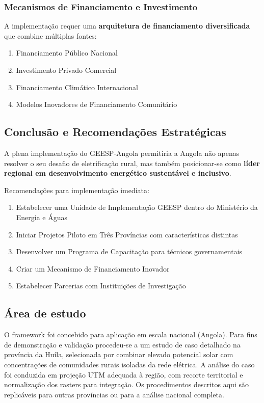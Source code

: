 \documentclass[12pt, a4paper]{article}
\begin{document}
\subsubsection{Mecanismos de Financiamento e Investimento}

A implementação requer uma \textbf{arquitetura de financiamento diversificada} que combine múltiplas fontes:
\begin{enumerate}
\item Financiamento Público Nacional
\item Investimento Privado Comercial
\item Financiamento Climático Internacional
\item Modelos Inovadores de Financiamento Comunitário
\end{enumerate}

\subsection{Conclusão e Recomendações Estratégicas}

A plena implementação do GEESP-Angola permitiria a Angola não apenas resolver o seu desafio de eletrificação rural, mas também posicionar-se como \textbf{líder regional em desenvolvimento energético sustentável e inclusivo}.

Recomendações para implementação imediata:
\begin{enumerate}
\item Estabelecer uma Unidade de Implementação GEESP dentro do Ministério da Energia e Águas
\item Iniciar Projetos Piloto em Três Províncias com características distintas
\item Desenvolver um Programa de Capacitação para técnicos governamentais
\item Criar um Mecanismo de Financiamento Inovador
\item Estabelecer Parcerias com Instituições de Investigação
\end{enumerate}

\subsection{Área de estudo}

O framework foi concebido para aplicação em escala nacional (Angola). Para fins de demonstração e validação procedeu‑se a um estudo de caso detalhado na província da Huíla, selecionada por combinar elevado potencial solar com concentrações de comunidades rurais isoladas da rede elétrica. A análise do caso foi conduzida em projeção UTM adequada à região, com recorte territorial e normalização dos rasters para integração. Os procedimentos descritos aqui são replicáveis para outras províncias ou para a análise nacional completa.
\end{document}
